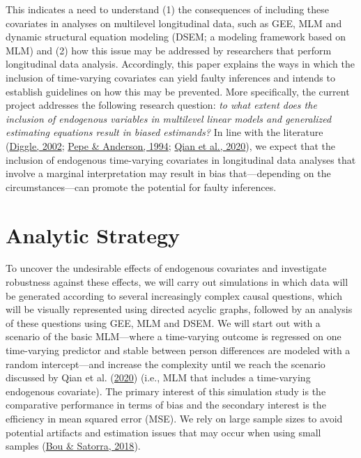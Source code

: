 \documentclass[
  12pt,
  a4paper,
]{article}
\begin{document}
This indicates a need to understand (1) the consequences of including
these covariates in analyses on multilevel longitudinal data, such as
GEE, MLM and dynamic structural equation modeling (DSEM; a modeling
framework based on MLM) and (2) how this issue may be addressed by
researchers that perform longitudinal data analysis. Accordingly, this
paper explains the ways in which the inclusion of time-varying
covariates can yield faulty inferences and intends to establish
guidelines on how this may be prevented. More specifically, the current
project addresses the following research question: \emph{to what extent
does the inclusion of endogenous variables in multilevel linear models
and generalized estimating equations result in biased estimands?} In
line with the literature (\protect\hyperlink{ref-diggle2002}{Diggle,
2002}; \protect\hyperlink{ref-pepe1994}{Pepe \& Anderson, 1994};
\protect\hyperlink{ref-qian2020}{Qian et al., 2020}), we expect that the
inclusion of endogenous time-varying covariates in longitudinal data
analyses that involve a marginal interpretation may result in bias
that---depending on the circumstances---can promote the potential for
faulty inferences.

\hypertarget{analytic-strategy}{%
\section{Analytic Strategy}\label{analytic-strategy}}

To uncover the undesirable effects of endogenous covariates and
investigate robustness against these effects, we will carry out
simulations in which data will be generated according to several
increasingly complex causal questions, which will be visually
represented using directed acyclic graphs, followed by an analysis of
these questions using GEE, MLM and DSEM. We will start out with a
scenario of the basic MLM---where a time-varying outcome is regressed on
one time-varying predictor and stable between person differences are
modeled with a random intercept---and increase the complexity until we
reach the scenario discussed by Qian et al.
(\protect\hyperlink{ref-qian2020}{2020}) (i.e., MLM that includes a
time-varying endogenous covariate). The primary interest of this
simulation study is the comparative performance in terms of bias and the
secondary interest is the efficiency in mean squared error (MSE). We
rely on large sample sizes to avoid potential artifacts and estimation
issues that may occur when using small samples
(\protect\hyperlink{ref-bou2018}{Bou \& Satorra, 2018}).
\end{document}
